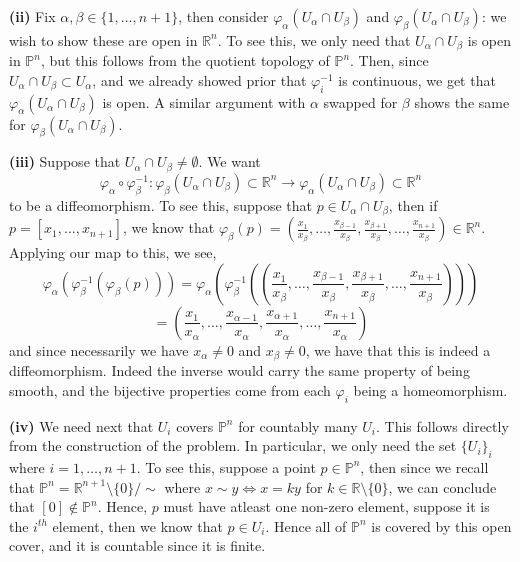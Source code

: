 \documentclass[10pt]{article}
\newcommand{\R}{\mathbb{R}}
\newcommand{\Pro}{\mathbb{P}}
\begin{document}
\textbf{(ii)}
Fix $\alpha,\beta\in\{1,\dots,n+1\}$, then consider $\varphi_{\alpha}(U_{\alpha}\cap U_{\beta})$ and $\varphi_{\beta}(U_{\alpha}\cap U_{\beta})$: we wish to show these are open in $\R^{n}$. To see this, we only need that $U_{\alpha}\cap U_{\beta}$ is open in $\Pro^{n}$, but this follows from the quotient topology of $\Pro^{n}$. Then, since $U_{\alpha}\cap U_{\beta} \subset U_{\alpha}$, and we already showed prior that $\varphi_{i}^{-1}$ is continuous, we get that $\varphi_{\alpha}(U_{\alpha}\cap U_{\beta})$ is open. A similar argument with $\alpha$ swapped for $\beta$ shows the same for $\varphi_{\beta}(U_{\alpha}\cap U_{\beta})$.

\newpage

\textbf{(iii)}
Suppose that $U_{\alpha}\cap U_{\beta} \neq \emptyset$. We want
$$\varphi_{\alpha}\circ\varphi_{\beta}^{-1}: \varphi_{\beta}(U_{\alpha}\cap U_{\beta}) \subset \R^{n} \to \varphi_{\alpha}(U_{\alpha}\cap U_{\beta})\subset \R^{n}$$
to be a diffeomorphism. To see this, suppose that $p\in U_{\alpha}\cap U_{\beta}$, then if $p = [x_{1}, \dots, x_{n+1}]$, we know that $\varphi_{\beta}(p) = \left(\frac{x_{1}}{x_{\beta}},\dots,\frac{x_{\beta -1}}{x_{\beta}},\frac{x_{\beta+1}}{x_{\beta}},\dots,\frac{x_{n+1}}{x_{\beta}}\right)\in \R^{n}$. Applying our map to this, we see,
$$\varphi_{\alpha}(\varphi_{\beta}^{-1}(\varphi_{\beta}(p))) = \varphi_{\alpha}\left(\varphi_{\beta}^{-1}\left(\left(\frac{x_{1}}{x_{\beta}},\dots,\frac{x_{\beta -1}}{x_{\beta}},\frac{x_{\beta+1}}{x_{\beta}},\dots,\frac{x_{n+1}}{x_{\beta}}\right)\right)\right)$$
$$ = \left(\frac{x_{1}}{x_{\alpha}},\dots,\frac{x_{\alpha -1}}{x_{\alpha}},\frac{x_{\alpha+1}}{x_{\alpha}},\dots,\frac{x_{n+1}}{x_{\alpha}}\right)$$
and since necessarily we have $x_{\alpha} \neq 0$ and $x_{\beta} \neq 0$, we have that this is indeed a diffeomorphism. Indeed the inverse would carry the same property of being smooth, and the bijective properties come from each $\varphi_{i}$ being a homeomorphism.

\textbf{(iv)}
We need next that $U_{i}$ covers $\Pro^{n}$ for countably many $U_{i}$. This follows directly from the construction of the problem. In particular, we only need the set $\{U_{i}\}_{i}$ where $i = 1,\dots,n+1$. To see this, suppose a point $p\in \Pro^{n}$, then since we recall that $\Pro^{n} = \R^{n+1}\setminus\{0\}/\sim$ where $x \sim y \iff x = ky$ for $k\in \R\setminus \{0\}$, we can conclude that $[0]\notin \Pro^{n}$. Hence, $p$ must have atleast one non-zero element, suppose it is the $i^{th}$ element, then we know that $p\in U_{i}$. Hence all of $\Pro^{n}$ is covered by this open cover, and it is countable since it is finite.
\end{document}
